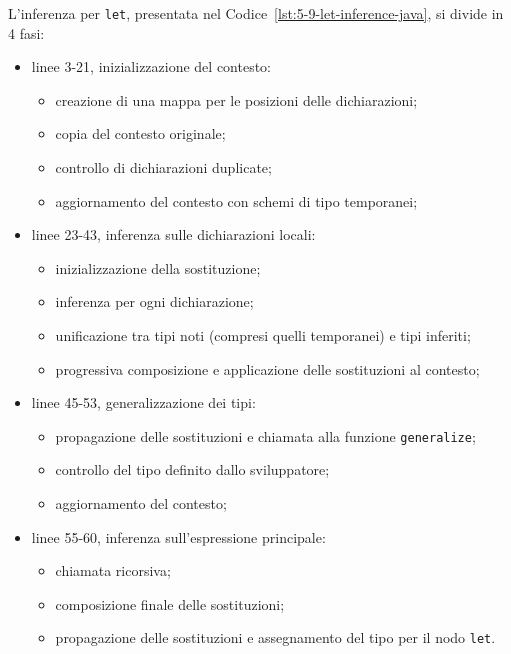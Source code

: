 \noindent L'inferenza per \texttt{let}, presentata nel Codice~\ref{lst:5-9-let-inference-java}, si divide in 4 fasi:
\begin{itemize}
    \item linee 3-21, inizializzazione del contesto:
          \begin{itemize}
              \item creazione di una mappa per le posizioni delle dichiarazioni;
              \item copia del contesto originale;
              \item controllo di dichiarazioni duplicate;
              \item aggiornamento del contesto con schemi di tipo temporanei;
          \end{itemize}
    \item linee 23-43, inferenza sulle dichiarazioni locali:
          \begin{itemize}
              \item inizializzazione della sostituzione;
              \item inferenza per ogni dichiarazione;
              \item unificazione tra tipi noti (compresi quelli temporanei) e tipi inferiti;
              \item progressiva composizione e applicazione delle sostituzioni al contesto;
          \end{itemize}
    \item linee 45-53, generalizzazione dei tipi:
          \begin{itemize}
              \item propagazione delle sostituzioni e chiamata alla funzione \texttt{generalize};
              \item controllo del tipo definito dallo sviluppatore;
              \item aggiornamento del contesto;
          \end{itemize}
    \item linee 55-60, inferenza sull'espressione principale:
          \begin{itemize}
              \item chiamata ricorsiva;
              \item composizione finale delle sostituzioni;
              \item propagazione delle sostituzioni e assegnamento del tipo per il nodo \texttt{let}.
          \end{itemize}
\end{itemize}

